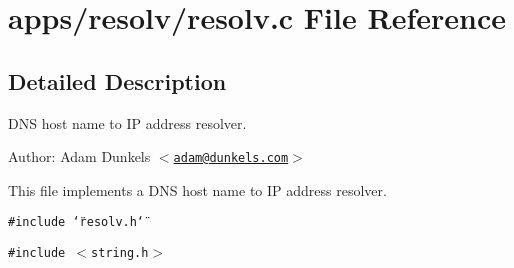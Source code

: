 \hypertarget{a00039}{
\section{apps/resolv/resolv.c File Reference}
\label{a00039}
}


\subsection{Detailed Description}
DNS host name to IP address resolver. 

\begin{Desc}
\item[Author:]Adam Dunkels $<$\href{mailto:adam@dunkels.com}{\tt adam@dunkels.com}$>$\end{Desc}
This file implements a DNS host name to IP address resolver. 

{\tt \#include \char`\"{}resolv.h\char`\"{}}\par
{\tt \#include $<$string.h$>$}\par


